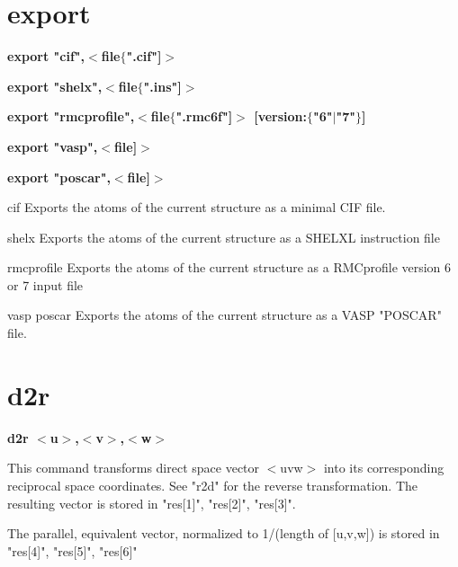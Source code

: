 \section{export}
{\bf export "cif",$ <$file$ \{$".cif"]$> $ \par }
{\bf export "shelx",$ <$file$ \{$".ins"]$> $ \par }
{\bf export "rmcprofile",$ <$file$ \{$".rmc6f"]$> $  [version:$ \{$"6"$| $"7"$\} $] \par }
{\bf export "vasp",$ <$file]$> $ \par }
{\bf export "poscar",$ <$file]$> $ \par }
\par
\vspace{3pt}
cif 
Exports the atoms of the current structure as a minimal CIF 
file. 
\par
shelx 
Exports the atoms of the current structure as a SHELXL instruction file 
\par
rmcprofile 
Exports the atoms of the current structure as a RMCprofile 
version 6 or 7 input file 
\par
vasp 
poscar 
Exports the atoms of the current structure as a VASP "POSCAR" file. 
\section{d2r}
{\bf d2r $ <$u$> $,$ <$v$> $,$ <$w$> $ \par }
\par
\vspace{3pt}
This command transforms direct space vector $ <$uvw$> $ into its corresponding 
reciprocal space coordinates. See "r2d" for the reverse transformation. 
The resulting vector is stored in "res[1]", "res[2]", "res[3]". 
\par
The parallel, equivalent vector, normalized to 1/(length of [u,v,w]) 
is stored in "res[4]", "res[5]", "res[6]" 
